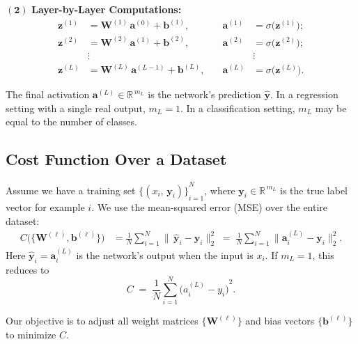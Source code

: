\documentclass{article}
\begin{document}
\medskip
\noindent\(\mathbf{(2)}\) \textbf{Layer-by-Layer Computations:}
\[
\begin{aligned}
    \mathbf{z}^{(1)} 
    &= \mathbf{W}^{(1)}\,\mathbf{a}^{(0)} + \mathbf{b}^{(1)}, 
    &\quad
    \mathbf{a}^{(1)} 
    &= \sigma\bigl(\mathbf{z}^{(1)}\bigr); 
    \\
    \mathbf{z}^{(2)} 
    &= \mathbf{W}^{(2)}\,\mathbf{a}^{(1)} + \mathbf{b}^{(2)}, 
    &\quad
    \mathbf{a}^{(2)} 
    &= \sigma\bigl(\mathbf{z}^{(2)}\bigr);
    \\
    &\vdots 
    &\quad 
    &\vdots 
    \\
    \mathbf{z}^{(L)} 
    &= \mathbf{W}^{(L)}\,\mathbf{a}^{(L-1)} + \mathbf{b}^{(L)}, 
    &\quad
    \mathbf{a}^{(L)} 
    &= \sigma\bigl(\mathbf{z}^{(L)}\bigr).
\end{aligned}
\]

\noindent The final activation \(\mathbf{a}^{(L)}\in \mathbb{R}^{\,m_{L}}\) is the network's prediction \(\hat{\mathbf{y}}\).  In a regression setting with a single real output, \(m_{L}=1\).  In a classification setting, \(m_{L}\) may be equal to the number of classes.

\subsection{Cost Function Over a Dataset}\label{sec:n-inputs-layers-cost}

\noindent Assume we have a training set \({\{(x_{i},\,\mathbf{y}_{i})\}}_{i=1}^N\), where \(\mathbf{y}_{i}\in \mathbb{R}^{\,m_{L}}\) is the true label vector for example \(i\).  We use the mean-squared error (MSE) over the entire dataset:
\begin{align}
    C\bigl(\{\mathbf{W}^{(\ell)},\mathbf{b}^{(\ell)}\}\bigr)
    &= \frac{1}{N}\sum_{i=1}^N 
       \bigl\|\,\hat{\mathbf{y}}_{i} - \mathbf{y}_{i}\bigr\|_{2}^{2}
    \;=\; \frac{1}{N}\sum_{i=1}^N 
       \bigl\|\mathbf{a}_{i}^{(L)} - \mathbf{y}_{i}\bigr\|_{2}^{2}.
    \label{eq:n-inputs-layers-full-cost}
\end{align}
Here \(\hat{\mathbf{y}}_{i} = \mathbf{a}_{i}^{(L)}\) is the network's output when the input is \(x_{i}\).  If \(m_{L}=1\), this reduces to
\[
    C \;=\; \frac{1}{N}\sum_{i=1}^N {\bigl(a_{i}^{(L)} - y_{i}\bigr)}^{2}.
\]

\medskip
\noindent Our objective is to adjust all weight matrices \(\{\mathbf{W}^{(\ell)}\}\) and bias vectors \(\{\mathbf{b}^{(\ell)}\}\) to minimize \(C\).
\end{document}
